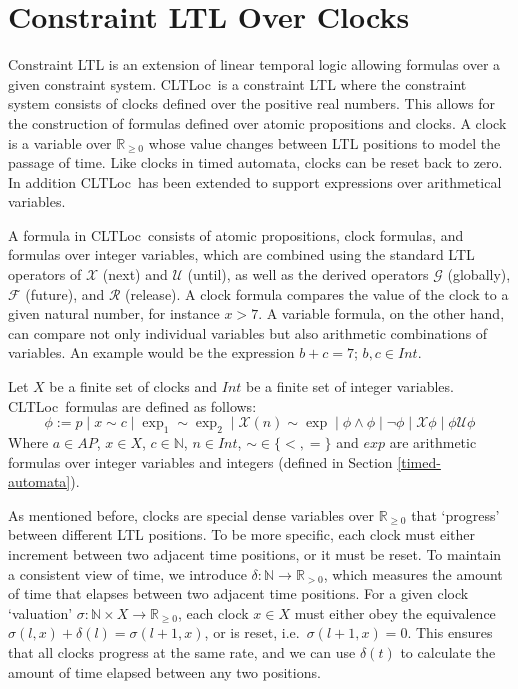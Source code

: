 \documentclass[a4paper,11pt]{report}
\newcommand*\BitOr{\mathbin{|}}
\theoremstyle{definition}
\newcommand{\cltloc}{CLTLoc}
\begin{document}
\section{Constraint LTL Over Clocks}\label{cltloc}

Constraint LTL is an extension of linear temporal logic allowing formulas over a
given constraint system\cite{demri07}. \cltloc\ is a constraint LTL where the
constraint system consists of clocks defined over the positive real numbers.
This allows for the construction of formulas defined over atomic propositions
and clocks. A clock is a variable over \(\mathbb{R}_{\geq 0}\) whose value
changes between LTL positions to model the passage of time. Like clocks in timed
automata, clocks can be reset back to zero. In addition \cltloc\ has been
extended to support expressions over arithmetical variables\cite{marconi16}.

A formula in \cltloc\ consists of atomic propositions, clock formulas, and
formulas over integer variables, which are combined using the standard LTL
operators of \(\mathcal{X}\) (next) and \(\mathcal{U}\) (until), as well as the
derived operators \(\mathcal{G}\) (globally), \(\mathcal{F}\) (future), and
\(\mathcal{R}\) (release). A clock formula compares the value of the clock to a
given natural number, for instance \(x > 7\). A variable formula, on the other
hand, can compare not only individual variables but also arithmetic combinations
of variables. An example would be the expression \(b + c = 7\); \(b,c \in Int\).

Let \(X\) be a finite set of clocks and \(Int\) be a finite set of integer
variables. \cltloc\ formulas are defined as follows:
\[\phi := p \BitOr x \sim c \BitOr \exp_{1} \sim \exp_{2} \BitOr \mathcal{X}(n) \sim \exp \BitOr \phi \land \phi \BitOr \neg \phi \BitOr \mathcal{X}\phi \BitOr \phi \mathcal{U} \phi \]
Where \(a \in AP\), \(x \in X\), \(c \in \mathbb{N}\), \(n \in Int\),
$\sim \in \{<,=\} $ and \(exp\) are arithmetic formulas over integer variables
and integers (defined in Section \ref{timed-automata}).

As mentioned before, clocks are special dense variables over
\(\mathbb{R}_{\geq 0}\) that `progress' between different LTL positions. To be
more specific, each clock must either increment between two adjacent time
positions, or it must be reset. To maintain a consistent view of time, we
introduce \(\delta: \mathbb{N} \rightarrow \mathbb{R}_{>0}\), which measures the
amount of time that elapses between two adjacent time positions. For a given
clock `valuation'
\(\sigma: \mathbb{N} \times X \rightarrow \mathbb{R}_{\geq 0}\), each clock
\(x \in X\) must either obey the equivalence
\(\sigma(l,x) + \delta(l) = \sigma(l+1,x)\), or is reset, i.e.\
\(\sigma(l+1,x) = 0\). This ensures that all clocks progress at the same rate,
and we can use \(\delta(t)\) to calculate the amount of time elapsed between any
two positions.
\end{document}

